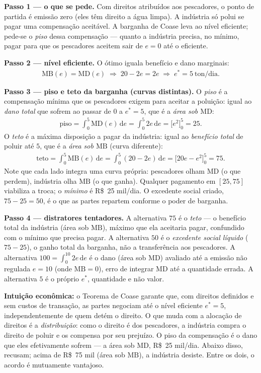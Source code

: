 \begin{solucao}
\textbf{Passo 1 — o que se pede.} Com direitos atribuídos aos pescadores, o ponto de partida é emissão zero (eles têm direito a água limpa). A indústria só polui se pagar uma compensação aceitável. A barganha de Coase leva ao nível eficiente; pede-se o \emph{piso} dessa compensação — quanto a indústria precisa, no mínimo, pagar para que os pescadores aceitem sair de $e=0$ até o eficiente.

\textbf{Passo 2 — nível eficiente.} O ótimo iguala benefício e dano marginais:
\begin{align*}
\text{MB}(e)=\text{MD}(e)\;\Longrightarrow\; 20-2e=2e\;\Longrightarrow\; e^{*}=5\ \text{ton/dia}.
\end{align*}

\textbf{Passo 3 — piso e teto da barganha (curvas distintas).} O \emph{piso} é a compensação mínima que os pescadores exigem para aceitar a poluição: igual ao \emph{dano total} que sofrem ao passar de $0$ a $e^{*}=5$, que é a \emph{área sob $\text{MD}$}:
\begin{align*}
\text{piso}=\int_{0}^{5}\text{MD}(e)\,\mathrm{d}e=\int_{0}^{5} 2e\,\mathrm{d}e=\big[e^{2}\big]_{0}^{5}=25.
\end{align*}
O \emph{teto} é a máxima disposição a pagar da indústria: igual ao \emph{benefício total} de poluir até $5$, que é a \emph{área sob $\text{MB}$} (curva diferente):
\begin{align*}
\text{teto}=\int_{0}^{5}\text{MB}(e)\,\mathrm{d}e=\int_{0}^{5}(20-2e)\,\mathrm{d}e=\big[20e-e^{2}\big]_{0}^{5}=75.
\end{align*}
Note que cada lado integra uma curva própria: pescadores olham $\text{MD}$ (o que perdem), indústria olha $\text{MB}$ (o que ganha). Qualquer pagamento em $[25,75]$ viabiliza a troca; o \emph{mínimo} é R\$~25 mil/dia. O excedente social criado, $75-25=50$, é o que as partes repartem conforme o poder de barganha.

\textbf{Passo 4 — distratores tentadores.} A alternativa $75$ é o \emph{teto} — o benefício total da indústria (área sob $\text{MB}$), máximo que ela aceitaria pagar, confundido com o mínimo que precisa pagar. A alternativa $50$ é o \emph{excedente social líquido} ($75-25$), o ganho total da barganha, não a transferência aos pescadores. A alternativa $100=\int_{0}^{10}2e\,\mathrm{d}e$ é o dano (área sob $\text{MD}$) avaliado até a emissão não regulada $e=10$ (onde $\text{MB}=0$), erro de integrar $\text{MD}$ até a quantidade errada. A alternativa $5$ é o próprio $e^{*}$, quantidade e não valor.

\textbf{Intuição econômica:} o Teorema de Coase garante que, com direitos definidos e sem custos de transação, as partes negociam até o nível eficiente $e^{*}=5$, independentemente de quem detém o direito. O que muda com a alocação de direitos é a \emph{distribuição}: como o direito é dos pescadores, a indústria compra o direito de poluir e os compensa por seu prejuízo. O piso da compensação é o dano que eles efetivamente sofrem — a área sob $\text{MD}$, R\$~25 mil/dia. Abaixo disso, recusam; acima de R\$~75 mil (área sob $\text{MB}$), a indústria desiste. Entre os dois, o acordo é mutuamente vantajoso.
\end{solucao}

